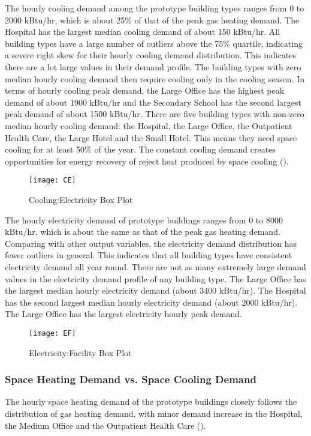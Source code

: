 The hourly cooling demand among the prototype building types ranges
from 0 to 2000 kBtu/hr, which is about 25\% of that of the peak gas
heating demand. The Hospital has the largest median cooling demand of
about 150 kBtu/hr. All building types have a large number of outliers
above the 75\% quartile, indicating a severe right skew for their
hourly cooling demand distribution. This indicates there are a lot
large values in their demand profile.  The building types with zero
median hourly cooling demand then require cooling only in the cooling
season. In terms of hourly cooling peak demand, the Large Office has
the highest peak demand of about 1900 kBtu/hr and the Secondary School
has the second largest peak demand of about 1500 kBtu/hr. There are
five building types with non-zero median hourly cooling demand: the
Hospital, the Large Office, the Outpatient Health Care, the Large
Hotel and the Small Hotel. This means they need space cooling for at
least 50\% of the year. The constant cooling demand creates
opportunities for energy recovery of reject heat produced by space
cooling ().
\begin{figure}[h!]
  \centering
  \texttt{[image: CE]}
  \caption[Cooling:Electricity Box Plot]{Cooling:Electricity Box Plot}
  \label{fig:CE}
\end{figure}%

The hourly electricity demand of prototype buildings ranges from 0 to
8000 kBtu/hr, which is about the same as that of the peak gas heating
demand. Comparing with other output variables, the electricity demand
distribution has fewer outliers in general. This indicates that all
building types have consistent electricity demand all year
round. There are not as many extremely large demand values in the
electricity demand profile of any building type. The Large Office
has the largest median hourly electricity demand (about 3400
kBtu/hr). The Hospital has the second largest median hourly
electricity demand (about 2000 kBtu/hr). The Large Office has the
largest electricity hourly peak demand.

\begin{figure}[h!]
  \centering
  \texttt{[image: EF]}
  \caption[Electricity:Facility Box Plot]{Electricity:Facility Box
    Plot}
  \label{fig:EF}
\end{figure}%

\subsubsection{Space Heating Demand vs. Space Cooling Demand}
The hourly space heating demand of the prototype buildings closely
follows the distribution of gas heating demand, with minor demand
increase in the Hospital, the Medium Office and the Outpatient Health
Care ().

